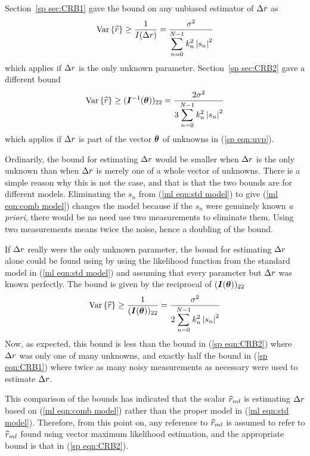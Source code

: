 Section~\ref{sp sec:CRB1} gave the \CR bound on any unbiased estimator of
${\Delta r}$ as
\begin{equation}\label{sp eqn:CRB1}
{\mathop{\rm Var}\nolimits\left\{\widehat{r}\right\}}\geq\frac{1}{I({\Delta r})}
=\frac{{\sigma^2}}{\displaystyle\sum_{n=0}^{N-1}k_n^2\left|s_n\right|^2}
\end{equation}
which applies if ${\Delta r}$ is the only unknown parameter.  
Section~\ref{sp sec:CRB2} gave a different \CR bound 
\begin{equation}\label{sp eqn:CRB2}
{\mathop{\rm Var}\nolimits\left\{\widehat{r}\right\}}\geq (\bm{I}^{-1}(\bm{\theta}))_{22}
=\frac{2{\sigma^2}}{3\displaystyle\sum_{n=0}^{N-1}k_n^2\left|s_n\right|^2}
\end{equation}
which applies if ${\Delta r}$ is part of the vector $\bm{\theta}$ of unknowns in 
(\ref{sp eqn:uvp}).  

Ordinarily, the \CR bound for estimating ${\Delta r}$ would be smaller 
when ${\Delta r}$ is the only unknown than when ${\Delta r}$ is merely one of a whole
vector of unknowns.  There is a simple reason why this is not the case, and
that is that the two \CR bounds are for different models.   Eliminating the
$s_n$ from (\ref{ml eqn:std model}) to give (\ref{ml eqn:comb model})
changes the model because if the $s_n$ were genuinely known {\em a
priori\/}, there would be no need use two measurements to eliminate them. 
Using two measurements means twice the noise, hence a doubling of the \CR
bound.

If ${\Delta r}$ really were the only unknown parameter, the \CR bound for estimating
${\Delta r}$ alone could be found using by using the likelihood function from the
standard model in (\ref{ml eqn:std model}) and assuming that every parameter
but ${\Delta r}$ was known perfectly.  The \CR bound is given by the
reciprocal of $(\bm{I}(\bm{\theta}))_{22}$
\begin{equation}\label{sp eqn:CRB3}
{\mathop{\rm Var}\nolimits\left\{\widehat{r}\right\}}\geq \frac{1}{(\bm{I}(\bm{\theta}))_{22}}
=\frac{{\sigma^2}}{2\displaystyle\sum_{n=0}^{N-1}k_n^2\left|s_n\right|^2}
\end{equation}
Now, as expected, this bound is less than the bound in (\ref{sp eqn:CRB2})
where ${\Delta r}$ was only one of many unknowns, and exactly half the bound in
(\ref{sp eqn:CRB1}) where twice as many noisy measurements as necessary were
used to estimate ${\Delta r}$.

This comparison of the \CR bounds has indicated that the scalar $\widehat{r}_{ml}$ is
estimating ${\Delta r}$ based on (\ref{ml eqn:comb model}) rather than the proper
model in (\ref{ml eqn:std model}).  Therefore, from this point on, any
reference to $\widehat{r}_{ml}$ is assumed to refer to $\widehat{r}_{ml}$ found using vector
maximum likelihood estimation, and the appropriate \CR bound is that in
(\ref{sp eqn:CRB2}).

